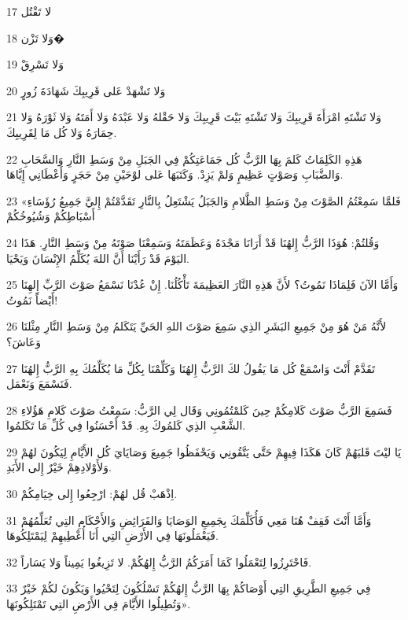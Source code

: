 \par 17 لا تَقْتُل
\par 18 وَلا تَزْن�
\par 19 وَلا تَسْرِقْ
\par 20 وَلا تَشْهَدْ عَلى قَرِيبِكَ شَهَادَةَ زُورٍ
\par 21 وَلا تَشْتَهِ امْرَأَةَ قَرِيبِكَ وَلا تَشْتَهِ بَيْتَ قَرِيبِكَ وَلا حَقْلهُ وَلا عَبْدَهُ وَلا أَمَتَهُ وَلا ثَوْرَهُ وَلا حِمَارَهُ وَلا كُل مَا لِقَرِيبِكَ.
\par 22 هَذِهِ الكَلِمَاتُ كَلمَ بِهَا الرَّبُّ كُل جَمَاعَتِكُمْ فِي الجَبَلِ مِنْ وَسَطِ النَّارِ وَالسَّحَابِ وَالضَّبَابِ وَصَوْتٍ عَظِيمٍ وَلمْ يَزِدْ. وَكَتَبَهَا عَلى لوْحَيْنِ مِنْ حَجَرٍ وَأَعْطَانِي إِيَّاهَا.
\par 23 «فَلمَّا سَمِعْتُمُ الصَّوْتَ مِنْ وَسَطِ الظَّلامِ وَالجَبَلُ يَشْتَعِلُ بِالنَّارِ تَقَدَّمْتُمْ إِليَّ جَمِيعُ رُؤَسَاءِ أَسْبَاطِكُمْ وَشُيُوخُكُمْ
\par 24 وَقُلتُمْ: هُوَذَا الرَّبُّ إِلهُنَا قَدْ أَرَانَا مَجْدَهُ وَعَظَمَتَهُ وَسَمِعْنَا صَوْتَهُ مِنْ وَسَطِ النَّارِ. هَذَا اليَوْمَ قَدْ رَأَيْنَا أَنَّ اللهَ يُكَلِّمُ الإِنْسَانَ وَيَحْيَا.
\par 25 وَأَمَّا الآنَ فَلِمَاذَا نَمُوتُ؟ لأَنَّ هَذِهِ النَّارَ العَظِيمَةَ تَأْكُلُنَا. إِنْ عُدْنَا نَسْمَعُ صَوْتَ الرَّبِّ إِلهِنَا أَيْضاً نَمُوتُ!
\par 26 لأَنَّهُ مَنْ هُوَ مِنْ جَمِيعِ البَشَرِ الذِي سَمِعَ صَوْتَ اللهِ الحَيِّ يَتَكَلمُ مِنْ وَسَطِ النَّارِ مِثْلنَا وَعَاشَ؟
\par 27 تَقَدَّمْ أَنْتَ وَاسْمَعْ كُل مَا يَقُولُ لكَ الرَّبُّ إِلهُنَا وَكَلِّمْنَا بِكُلِّ مَا يُكَلِّمُكَ بِهِ الرَّبُّ إِلهُنَا فَنَسْمَعَ وَنَعْمَل.
\par 28 فَسَمِعَ الرَّبُّ صَوْتَ كَلامِكُمْ حِينَ كَلمْتُمُونِي وَقَال لِي الرَّبُّ: سَمِعْتُ صَوْتَ كَلامِ هَؤُلاءِ الشَّعْبِ الذِي كَلمُوكَ بِهِ. قَدْ أَحْسَنُوا فِي كُلِّ مَا تَكَلمُوا.
\par 29 يَا ليْتَ قَلبَهُمْ كَانَ هَكَذَا فِيهِمْ حَتَّى يَتَّقُونِي وَيَحْفَظُوا جَمِيعَ وَصَايَايَ كُل الأَيَّامِ لِيَكُونَ لهُمْ وَلأَوْلادِهِمْ خَيْرٌ إِلى الأَبَدِ.
\par 30 اِذْهَبْ قُل لهُمْ: ارْجِعُوا إِلى خِيَامِكُمْ.
\par 31 وَأَمَّا أَنْتَ فَقِفْ هُنَا مَعِي فَأُكَلِّمَكَ بِجَمِيعِ الوَصَايَا وَالفَرَائِضِ وَالأَحْكَامِ التِي تُعَلِّمُهُمْ فَيَعْمَلُونَهَا فِي الأَرْضِ التِي أَنَا أُعْطِيهِمْ لِيَمْتَلِكُوهَا.
\par 32 فَاحْتَرِزُوا لِتَعْمَلُوا كَمَا أَمَرَكُمُ الرَّبُّ إِلهُكُمْ. لا تَزِيغُوا يَمِيناً وَلا يَسَاراً.
\par 33 فِي جَمِيعِ الطَّرِيقِ التِي أَوْصَاكُمْ بِهَا الرَّبُّ إِلهُكُمْ تَسْلُكُونَ لِتَحْيُوا وَيَكُونَ لكُمْ خَيْرٌ وَتُطِيلُوا الأَيَّامَ فِي الأَرْضِ التِي تَمْتَلِكُونَهَا».

